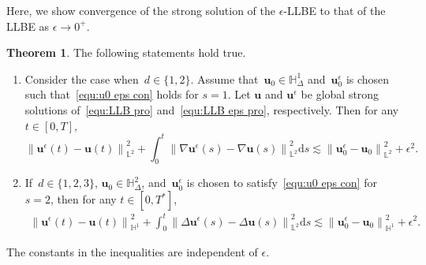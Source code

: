 \documentclass[11pt,reqno]{amsart}
\theoremstyle{definition}
\newtheorem{theorem}{Theorem}[section]
\numberwithin{equation}{section}
\newcommand{\bff}{\boldsymbol}
\newcommand{\bb}{\mathbb}
\newcommand{\ds}{\mathrm{d}s}
\newcommand{\norm}[2]{\left\|{#1}\right\|_{#2}}
\begin{document}
Here, we show convergence of the strong solution of the $\epsilon$-LLBE to that of the LLBE as $\epsilon\to 0^+$.

\begin{theorem}\label{the:u eps con u}
	The following statements hold true.
	\begin{enumerate}
		\renewcommand{\labelenumi}{\theenumi}
		\renewcommand{\theenumi}{{\rm (\roman{enumi})}}
		\item \label{ite:u eps u i}
		Consider the case when~$d\in\{1,2\}$. Assume that~$\bff{u}_0\in\bb{H}^1_\Delta$
		and~$\bff{u}_0^\epsilon$ is chosen such that~\eqref{equ:u0 eps con} holds for $s=1$.
		Let $\bff{u}$ and $\bff{u}^\epsilon$ be global strong
		solutions of~\eqref{equ:LLB pro} and~\eqref{equ:LLB eps pro},
		respectively.  Then for any $t\in[0,T]$,
		\begin{equation}\label{equ:solus}
			\norm{\bff{u}^\epsilon(t)-\bff{u}(t)}{\bb{L}^2}^2
			+
			\int_0^t 
			\norm{\nabla\bff{u}^\epsilon(s) - \nabla\bff{u}(s)}{\bb{L}^2}^2 \ds
			\lesssim 
			\norm{\bff{u}_0^\epsilon-\bff{u}_0}{\bb{L}^2}^2
			+
			\epsilon^2.
		\end{equation}
		\item \label{ite:u eps u ii}
		If~$d\in\{1,2,3\}$, $\bff{u}_0\in \bb{H}^2_\Delta$, and~$\bff{u}_0^\epsilon$ is
		chosen to satisfy~\eqref{equ:u0 eps con} for $s=2$, then for any $t\in [0,T^\ast]$,
		\begin{align}\label{equ:sol u H1}
			\norm{\bff{u}^\epsilon(t)-\bff{u}(t)}{\bb{H}^1}^2
			+
			\int_0^t \norm{\Delta\bff{u}^\epsilon(s) - \Delta\bff{u}(s)}{\bb{L}^2}^2 \ds
			\lesssim 
			\norm{\bff{u}_0^\epsilon-\bff{u}_0}{\bb{H}^1}^2
			+
			\epsilon^2.
		\end{align}
	\end{enumerate}
	The constants in the inequalities are independent of $\epsilon$.
\end{theorem}
\end{document}
